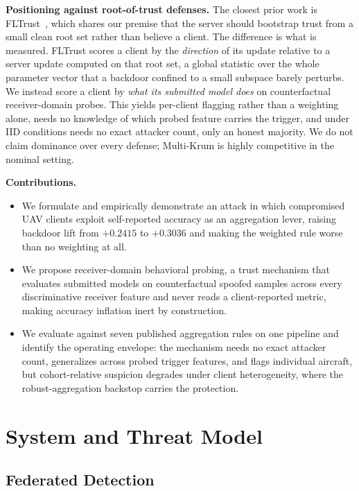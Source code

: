 \documentclass[conference]{IEEEtran}
\begin{document}
\textbf{Positioning against root-of-trust defenses.} The closest prior work is
FLTrust~\cite{cao2021fltrust}, which shares our premise that the server should
bootstrap trust from a small clean root set rather than believe a client. The
difference is what is measured. FLTrust scores a client by the \emph{direction}
of its update relative to a server update computed on that root set, a global
statistic over the whole parameter vector that a backdoor confined to a small
subspace barely perturbs. We instead score a client by \emph{what its submitted
model does} on counterfactual receiver-domain probes. This yields per-client
flagging rather than a weighting alone, needs no knowledge of which probed
feature carries the trigger, and under IID conditions needs no exact attacker
count, only an honest majority. We do not claim dominance over every defense;
Multi-Krum is highly competitive in the nominal setting.

\textbf{Contributions.}
\begin{itemize}
\item We formulate and empirically demonstrate an attack in which compromised
UAV clients exploit self-reported accuracy as an aggregation lever, raising
backdoor lift from $+0.2415$ to $+0.3036$ and making the weighted rule worse
than no weighting at all.
\item We propose receiver-domain behavioral probing, a trust mechanism that
evaluates submitted models on counterfactual spoofed samples across every
discriminative receiver feature and never reads a client-reported metric,
making accuracy inflation inert by construction.
\item We evaluate against seven published aggregation rules on one pipeline and
identify the operating envelope: the mechanism needs no exact attacker count,
generalizes across probed trigger features, and flags individual aircraft, but
cohort-relative suspicion degrades under client heterogeneity, where the
robust-aggregation backstop carries the protection.
\end{itemize}

\section{System and Threat Model}

\subsection{Federated Detection}
\end{document}
